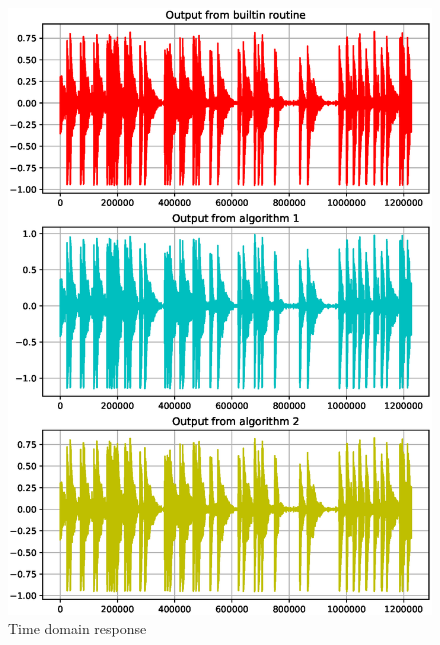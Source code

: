 \documentclass[journal,12pt,twocolumn]{IEEEtran}
\begin{document}
\begin{figure}[!h]
\centering
\includegraphics[width=1.2\columnwidth]{./figs/ee18btech11038_time.eps}
\caption{Time domain response}
\label{fig:Figure1}
\end{figure}
\\
\end{document}
